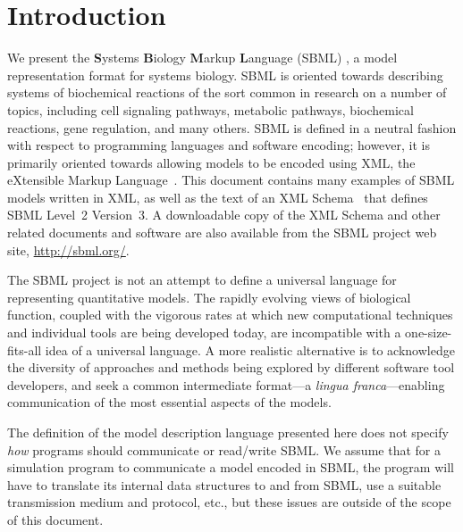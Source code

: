 
\section{Introduction}
\label{sec:introduction}

We present the \textbf{S}ystems \textbf{B}iology \textbf{M}arkup
\textbf{L}anguage (SBML) \thisLVR, a model
representation format for systems biology.  SBML is oriented
towards describing systems of biochemical reactions of the sort
common in research on a number of topics, including cell signaling
pathways, metabolic pathways, biochemical reactions, gene
regulation, and many others.  SBML is defined in a neutral fashion
with respect to programming languages and software encoding;
however, it is primarily oriented towards allowing models to be
encoded using XML, the eXtensible Markup
Language~\citep{bosak:1999,bray:2000}.  This document contains
many examples of SBML models written in XML, as well as the text
of an XML Schema~\citep{biron:2000,fallside:2000,thompson:2000}
that defines SBML Level~2 Version~3.  A
downloadable copy of the XML Schema and other related documents
and software are also available from the SBML project web site,
\url{http://sbml.org/}.

The SBML project is not an attempt to define a universal language
for representing quantitative models.  The rapidly evolving views
of biological function, coupled with the vigorous rates at which
new computational techniques and individual tools are being
developed today, are incompatible with a one-size-fits-all idea of
a universal language. A more realistic alternative is to
acknowledge the diversity of approaches and methods being explored
by different software tool developers, and seek a common
intermediate format---a \emph{lingua franca}---enabling
communication of the most essential aspects of the models.

The definition of the model description language presented here
does not specify \emph{how} programs should communicate or
read/write SBML.  We assume that for a simulation program to
communicate a model encoded in SBML, the program will have to
translate its internal data structures to and from SBML, use a
suitable transmission medium and protocol, etc., but these issues
are outside of the scope of this document.

